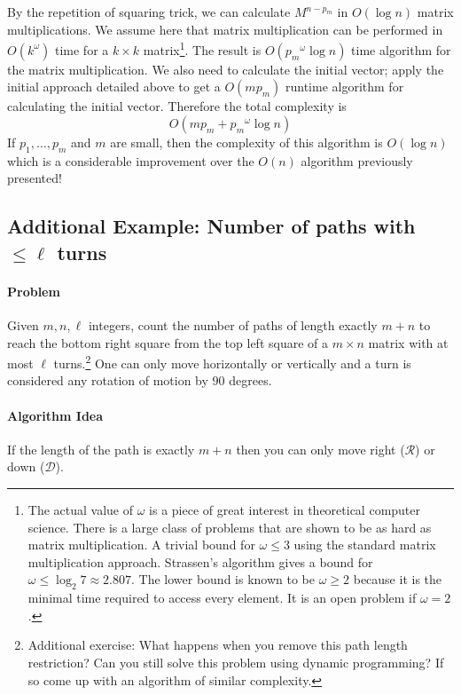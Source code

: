 \documentclass[11pt]{article}
\theoremstyle{plain}
\theoremstyle{definition}
\numberwithin{equation}{section}
\numberwithin{figure}{section}
\begin{document}
By the repetition of squaring trick, we can calculate $M^{n - p_m}$ in $O(\log n)$ matrix multiplications. We assume here that matrix multiplication can be performed in $O(k^\omega)$ time for a $k \times k$ matrix\footnote{The actual value of $\omega$ is a piece of great interest in theoretical computer science. There is a large class of problems that are shown to be as hard as matrix multiplication. A trivial bound for $\omega \leq 3$ using the standard matrix multiplication approach. Strassen's algorithm gives a bound for $\omega \leq \log_2 7 \approx 2.807$. The lower bound is known to be $\omega \geq 2$ because it is the minimal time required to access every element. It is an open problem if $\omega = 2$.}. The result is $O({p_m}^\omega \log n)$ time algorithm for the matrix multiplication. We also need to calculate the initial vector; apply the initial approach detailed above to get a $O(m p_m)$ runtime algorithm for calculating the initial vector. Therefore the total complexity is
\begin{equation}
O \left(m p_m + {p_m}^\omega \log n \right)
\end{equation}
If $p_1, \ldots, p_m$ and $m$ are small, then the complexity of this algorithm is $O(\log n)$ which is a considerable improvement over the $O(n)$ algorithm previously presented!

\subsection{Additional Example: Number of paths with $\leq \ell$ turns}

\paragraph{Problem} Given $m, n, \ell$ integers, count the number of paths of length exactly $m + n$ to reach the bottom right square from the top left square of a $m \times n$ matrix with at most $\ell$ turns.\footnote{Additional exercise: What happens when you remove this path length restriction? Can you still solve this problem using dynamic programming? If so come up with an algorithm of similar complexity.} One can only move horizontally or vertically and a turn is considered any rotation of motion by $90$ degrees.

\paragraph{Algorithm Idea} If the length of the path is exactly $m + n$ then you can only move right ($\mathcal{R}$) or down ($\mathcal{D}$). \\
\end{document}
